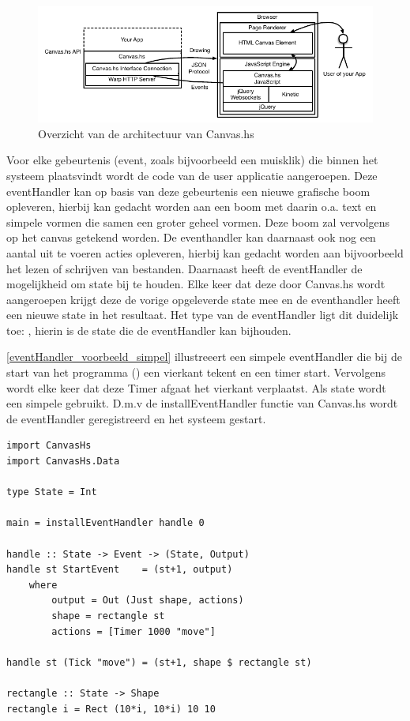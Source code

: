 \begin{figure}[H]
\begin{center}
\includegraphics[keepaspectratio,width=\textwidth]{./images/architectuur_overzicht.pdf}
\caption{Overzicht van de architectuur van Canvas.hs}
\label{fig:overzicht_architectuur}
\end{center}
\end{figure}


Voor elke gebeurtenis (event, zoals bijvoorbeeld een muisklik) die binnen het systeem plaatsvindt wordt de code van de user applicatie aangeroepen. Deze eventHandler kan op basis van deze gebeurtenis een nieuwe grafische boom opleveren, hierbij kan gedacht worden aan een boom met daarin o.a. text en simpele vormen die samen een groter geheel vormen. Deze boom zal vervolgens op het canvas getekend worden. De eventhandler kan daarnaast ook nog een aantal uit te voeren acties opleveren, hierbij kan gedacht worden aan bijvoorbeeld het lezen of schrijven van bestanden. Daarnaast heeft de eventHandler de mogelijkheid om state bij te houden. Elke keer dat deze door Canvas.hs wordt aangeroepen krijgt deze de vorige opgeleverde state mee en de eventhandler heeft een nieuwe state in het resultaat. Het type van de eventHandler ligt dit duidelijk toe: , hierin is  de state die de eventHandler kan bijhouden. 


\autoref{eventHandler_voorbeeld_simpel} illustreeert een simpele eventHandler die bij de start van het programma () een vierkant tekent en een timer start. Vervolgens wordt elke keer dat deze Timer afgaat het vierkant verplaatst. Als state wordt een simpele  gebruikt. D.m.v de installEventHandler functie van Canvas.hs wordt de eventHandler geregistreerd en het systeem gestart.

\begin{lstlisting}[caption=Voorbeeld van een simpele eventHandler, label=eventHandler_voorbeeld_simpel]
import CanvasHs
import CanvasHs.Data

type State = Int

main = installEventHandler handle 0

handle :: State -> Event -> (State, Output)
handle st StartEvent    = (st+1, output)
	where 
		output = Out (Just shape, actions)
		shape = rectangle st
		actions = [Timer 1000 "move"]
		
handle st (Tick "move") = (st+1, shape $ rectangle st)
		
rectangle :: State -> Shape
rectangle i = Rect (10*i, 10*i) 10 10
\end{lstlisting}

